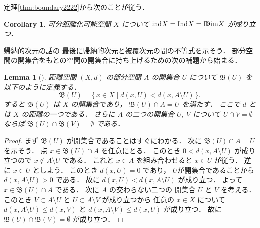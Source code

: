 \documentclass[leqno, a4paper, 12pt]{jsarticle}
\theoremstyle{plain}
\newtheorem{cor}[thm]{Corollary}
\newtheorem{lem}[thm]{Lemma}
\theoremstyle{definition}
\theoremstyle{remark}
\newcommand{\yoind}{\mathrm{ind}}
\newcommand{\yolind}{\mathrm{Ind}}
\newcommand{\yoddim}{\mathrm{D\hspace{-5.5pt}Dim}}
\newcommand{\yoliftset}[1]{\mathfrak{B}(#1)}
\numberwithin{equation}{section}
\begin{document}
定理\ref{thm:boundary2222}から次のことが従う．
\begin{cor}\label{cor:sum:lindinddim}
可分距離化可能空間
$X$
について
$\yoind X=\yolind X=\yoddim X$
が成り立つ．
\end{cor}













帰納的次元の話の
最後に帰納的次元と被覆次元の間の不等式を示そう．
部分空間の開集合をもとの空間の開集合に持ち上げるための次の補題から始まる．

\begin{lem}[\cite{zbMATH03057246}]\label{lem:lift:kuratowski}
距離空間
$(X, d)$
の部分空間
$A$
の開集合
$U$
について
$\yoliftset{U}$
を以下のように定義する．
\[
\yoliftset{U}
=
\{\, x\in X \mid d(x,U)<d(x,A\setminus U)\, \}. 
\]
すると
$\yoliftset{U}$
は
$X$
の開集合であり，
$\yoliftset{U}\cap A=U$
を満たす．
ここで
$d$
とは
$X$
の距離の一つである．
さらに
$A$
の二つの開集合
$U$, 
$V$
について
$U\cap V=\emptyset$
ならば
$\yoliftset{U}\cap \yoliftset{V}=\emptyset$
である．
\end{lem}
\begin{proof}
まず
$\yoliftset{U}$
が開集合であることはすぐにわかる．
次に
$\yoliftset{U}\cap A=U$
を示そう．
点
$x\in \yoliftset{U}\cap A$
を任意にとる．
このとき
$0<d(x, A\setminus U)$
が成り立つので
$x\not \in A\setminus U$
である．
これと
$x\in A$
を組み合わせると
$x\in U$
が従う．
逆に
$x\in U$
としよう．
このとき
$d(x, U)=0$
であり，
$U$が開集合であることから
$d(x, A\setminus U)>0$
である．
故に
$d(x, U)<d(x, A\setminus U)$
が成り立つ．
よって
$x\in \yoliftset{U}\cap A$
である．
次に
$A$
の交わらない二つの
開集合
$U$
と
$V$
を考える．
このとき
$V\subset A\setminus U$
と
$U\subset A\setminus V$
が成り立つから
任意の
$x\in X$
について
$d(x, A\setminus U)\le d(x, V)$
と
$d(x, A\setminus V)\le d(x, U)$
が成り立つ．
故に
$\yoliftset{U}\cap \yoliftset{V}=\emptyset$
が成り立つ．
\end{proof}
\end{document}
